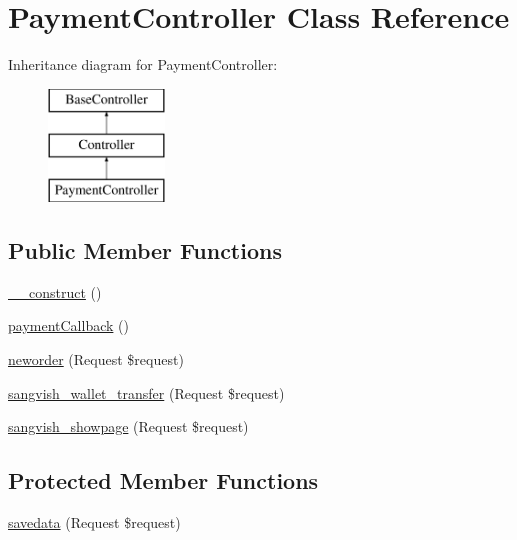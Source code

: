 \hypertarget{class_responsive_1_1_http_1_1_controllers_1_1_payment_controller}{}\section{Payment\+Controller Class Reference}
\label{class_responsive_1_1_http_1_1_controllers_1_1_payment_controller}
Inheritance diagram for Payment\+Controller\+:\begin{figure}[H]
\begin{center}
\leavevmode
\includegraphics[height=3.000000cm]{class_responsive_1_1_http_1_1_controllers_1_1_payment_controller}
\end{center}
\end{figure}
\subsection*{Public Member Functions}
\begin{DoxyCompactItemize}
\item 
\mbox{\hyperlink{class_responsive_1_1_http_1_1_controllers_1_1_payment_controller_a095c5d389db211932136b53f25f39685}{\+\_\+\+\_\+construct}} ()
\item 
\mbox{\hyperlink{class_responsive_1_1_http_1_1_controllers_1_1_payment_controller_a4fde5ff369bdee0aec91a53db06bc0cc}{payment\+Callback}} ()
\item 
\mbox{\hyperlink{class_responsive_1_1_http_1_1_controllers_1_1_payment_controller_ad49ed12ec9196d3d81e10d974539a0fa}{neworder}} (Request \$request)
\item 
\mbox{\hyperlink{class_responsive_1_1_http_1_1_controllers_1_1_payment_controller_acfb498a2a1c24de1fd6bfb9fabf2ffad}{sangvish\+\_\+wallet\+\_\+transfer}} (Request \$request)
\item 
\mbox{\hyperlink{class_responsive_1_1_http_1_1_controllers_1_1_payment_controller_ad3a43cf2cd7cf969c7972fcea3aa90df}{sangvish\+\_\+showpage}} (Request \$request)
\end{DoxyCompactItemize}
\subsection*{Protected Member Functions}
\begin{DoxyCompactItemize}
\item 
\mbox{\hyperlink{class_responsive_1_1_http_1_1_controllers_1_1_payment_controller_a39992cc1c190dd16b2de573a70a7f5dc}{savedata}} (Request \$request)
\end{DoxyCompactItemize}


